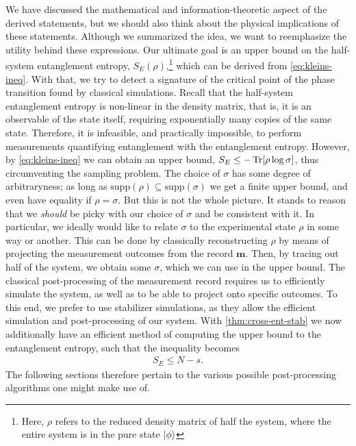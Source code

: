 We have discussed the mathematical and information-theoretic aspect of the
derived statements, but we should also think about the physical
implications of these statements. Although we summarized the idea, we want to
reemphasize the utility behind these expressions.
Our ultimate goal is an upper bound on the half-system
entanglement entropy, $S_E\left( \rho \right)$,\footnote{Here, $\rho$ refers to
the reduced density matrix of half the system, where the entire system is in
the pure state $\ket{\phi}$} which can be derived from \cref{eq:kleins-ineq}.
With that, we try to detect a signature of the critical point of the phase
transition found by classical simulations. Recall that the half-system
entanglement entropy is non-linear in the density matrix, that is, it is an
observable of the state itself, requiring exponentially many copies of the same
state. Therefore, it is infeasible, and practically impossible, to perform
measurements quantifying entanglement with the entanglement entropy. However,
by \cref{eq:kleins-ineq} we can obtain an upper bound, $S_E\leq
-\Tr[\rho\log\sigma]$, thus circumventing the sampling problem. The choice of
$\sigma$ has some degree of arbitraryness; as long as 
$\mathrm{supp}\left( \rho \right) \subseteq \mathrm{supp}\left( \sigma \right)$ 
we get a finite upper bound, and even have equality if $\rho = \sigma$.  But
this is not the whole picture. It stands to reason that we \emph{should} be
picky with our choice of $\sigma$ and be consistent with it.  In particular, we
ideally would like to relate $\sigma$ to the experimental state
$\rho$ in some way or another. This can be done by classically reconstructing
$\rho$ by means of projecting the measurement outcomes from the record
$\mathbf{m}$. Then, by tracing out half of the system, we obtain some
$\sigma$, which we can use in the upper bound. The classical post-processing of
the measurement record requires us to efficiently simulate the system, as well
as to be able to project onto specific outcomes. 
To this end, we prefer to use
stabilizer simulations, as they allow the efficient simulation and
post-processing of our system. With \cref{thm:cross-ent-stab} we now
additionally have an efficient method of computing the upper bound to the
entanglement entropy, such that the inequality becomes
\begin{align}
  S_E \leq N-s
.\end{align}
The following sections therefore pertain to the various possible
post-processing algorithms one might make use of. 

